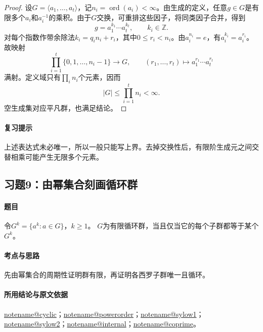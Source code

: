 \documentclass[UTF8,a4paper,11pt,fontset=windows]{ctexart}
\makeatletter
\newcommand{\Z}{\mathbb Z}\newcommand{\Q}{\mathbb Q}
\newcommand{\noteref}[1]{\hyperref[note:#1]{\csname notename@#1\endcsname}}
\newcommand{\exref}[2]{\hyperref[ex:#1:#2]{第#1章习题#2}}
\makeatother
\begin{document}
\begin{proof}
设$G=\langle a_1,\ldots,a_t\rangle$，记$n_i=\operatorname{ord}(a_i)<\infty$。由生成的定义，任意$g\in G$是有限多个$a_i$和$a_i^{-1}$的乘积。由于$G$交换，可重排这些因子，将同类因子合并，得到
\[
g=a_1^{k_1}\cdots a_t^{k_t},\qquad k_i\in\Z.
\]
对每个指数作带余除法$k_i=q_in_i+r_i$，其中$0\le r_i<n_i$。由$a_i^{n_i}=e$，有$a_i^{k_i}=a_i^{r_i}$。故映射
\[
\prod_{i=1}^t\{0,1,\ldots,n_i-1\}\longrightarrow G,
\qquad(r_1,\ldots,r_t)\longmapsto a_1^{r_1}\cdots a_t^{r_t}
\]
满射。定义域只有$\prod_i n_i$个元素，因而
\[
|G|\le\prod_{i=1}^t n_i<\infty.
\]
空生成集对应平凡群，也满足结论。
\end{proof}

\paragraph{复习提示}
上述表达式未必唯一，所以一般只能写上界。去掉交换性后，有限阶生成元之间交替相乘可能产生无限多个元素。


\subsection{习题9：\texorpdfstring{由幂集合刻画循环群}{由幂集合刻画循环群}}
\label{ex:2:9}

\paragraph{题目}
令$G^k=\{a^k:a\in G\}$，$k\geq1$。
$G$为有限循环群，当且仅当它的每个子群都等于某个$G^k$。

\paragraph{考点与思路}
先由幂集合的周期性证明群有限，再证明各西罗子群唯一且循环。

\paragraph{所用结论与原文依据}
\noteref{cyclic}；\noteref{powerorder}；\noteref{sylow1}；\noteref{sylow2}；\noteref{internal}；\noteref{coprime}。

\end{document}
